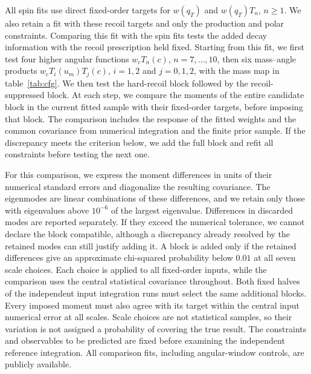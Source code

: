 All spin fits use direct fixed-order targets for $w(q_T)$ and $w(q_T)T_n$, $n\ge1$. We also retain a fit with these recoil targets and only the production and polar constraints. Comparing this fit with the spin fits tests the added decay information with the recoil prescription held fixed. Starting from this fit, we first test four higher angular functions $w_cT_n(c)$, $n=7,\ldots,10$, then six mass--angle products $w_cT_i(u_m)T_j(c)$, $i=1,2$ and $j=0,1,2$, with the mass map in table~\ref{tab:cfg}. We then test the hard-recoil block followed by the recoil-suppressed block. At each step, we compare the moments of the entire candidate block in the current fitted sample with their fixed-order targets, before imposing that block. The comparison includes the response of the fitted weights and the common covariance from numerical integration and the finite prior sample. If the discrepancy meets the criterion below, we add the full block and refit all constraints before testing the next one.

For this comparison, we express the moment differences in units of their numerical standard errors and diagonalize the resulting covariance. The eigenmodes are linear combinations of these differences, and we retain only those with eigenvalues above $10^{-6}$ of the largest eigenvalue. Differences in discarded modes are reported separately. If they exceed the numerical tolerance, we cannot declare the block compatible, although a discrepancy already resolved by the retained modes can still justify adding it. A block is added only if the retained differences give an approximate chi-squared probability below $0.01$ at all seven scale choices. Each choice is applied to all fixed-order inputs, while the comparison uses the central statistical covariance throughout. Both fixed halves of the independent input integration runs must select the same additional blocks. Every imposed moment must also agree with its target within the central input numerical error at all scales. Scale choices are not statistical samples, so their variation is not assigned a probability of covering the true result. The constraints and observables to be predicted are fixed before examining the independent reference integration. All comparison fits, including angular-window controls, are publicly available.

